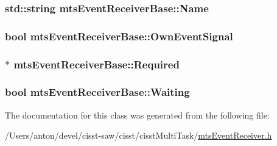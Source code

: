 \subsubsection[{Name}]{\setlength{\rightskip}{0pt plus 5cm}std\+::string mts\+Event\+Receiver\+Base\+::\+Name\hspace{0.3cm}{\ttfamily [protected]}}\label{classmts_event_receiver_base_adfb7eb58f27a2db2bb9bd6b43d50e851}
\hypertarget{classmts_event_receiver_base_a11a6911351875c41dce67ea5b3fb59fd}{}
\subsubsection[{Own\+Event\+Signal}]{\setlength{\rightskip}{0pt plus 5cm}bool mts\+Event\+Receiver\+Base\+::\+Own\+Event\+Signal\hspace{0.3cm}{\ttfamily [protected]}}\label{classmts_event_receiver_base_a11a6911351875c41dce67ea5b3fb59fd}
\hypertarget{classmts_event_receiver_base_aa614f14ccef40af5bde25c37226d0000}{}
\subsubsection[{Required}]{$\ast$ mts\+Event\+Receiver\+Base\+::\+Required\hspace{0.3cm}{\ttfamily [protected]}}\label{classmts_event_receiver_base_aa614f14ccef40af5bde25c37226d0000}
\hypertarget{classmts_event_receiver_base_a962d76302ff233185a6797fed4f7052b}{}
\subsubsection[{Waiting}]{\setlength{\rightskip}{0pt plus 5cm}bool mts\+Event\+Receiver\+Base\+::\+Waiting\hspace{0.3cm}{\ttfamily [protected]}}\label{classmts_event_receiver_base_a962d76302ff233185a6797fed4f7052b}


The documentation for this class was generated from the following file\+:\begin{DoxyCompactItemize}
\item 
/\+Users/anton/devel/cisst-\/saw/cisst/cisst\+Multi\+Task/\hyperlink{mts_event_receiver_8h}{mts\+Event\+Receiver.\+h}\end{DoxyCompactItemize}
